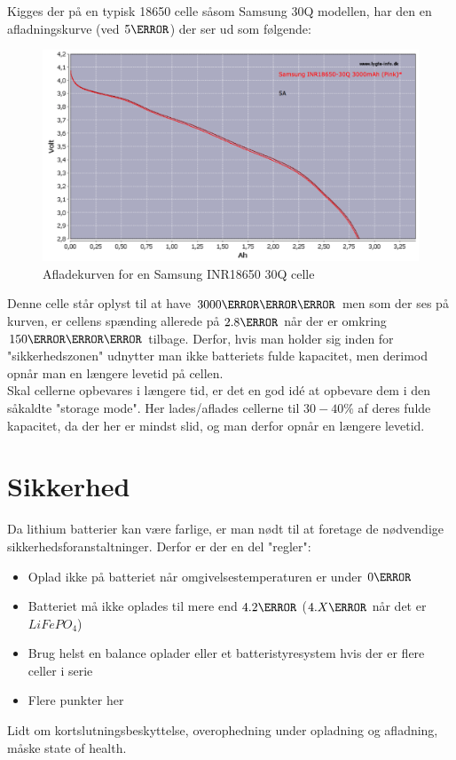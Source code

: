 Kigges der på en typisk 18650 celle såsom Samsung 30Q modellen, har den en afladningskurve (ved $5\ampere$) der ser ud som følgende: 

\begin{figure}[h]
\centering
\includegraphics[width=15cm]{billeder/samsung-inr18650-discharge.png}
\caption{Afladekurven for en Samsung INR18650 30Q celle\protect\footnotemark}
\label{fig:30q_discharge}
\end{figure}

Denne celle står oplyst til at have $3000\milli\ampere\hour$ men som der ses på kurven, er cellens spænding allerede på $2.8\volt$ når der er omkring $150\milli\ampere\hour$ tilbage. Derfor, hvis man holder sig inden for "sikkerhedszonen" \space udnytter man ikke batteriets fulde kapacitet, men derimod opnår man en længere levetid på cellen. \\

Skal cellerne opbevares i længere tid, er det en god idé at opbevare dem i den såkaldte "storage mode". Her lades/aflades cellerne til $30-40\percent$ af deres fulde kapacitet, da der her er mindst slid, og man derfor opnår en længere levetid. 

\section{Sikkerhed}
Da lithium batterier kan være farlige, er man nødt til at foretage de nødvendige sikkerhedsforanstaltninger. Derfor er der en del "regler":
\begin{itemize}
\item Oplad ikke på batteriet når omgivelsestemperaturen er under $0\degreeCelsius$
\item Batteriet må ikke oplades til mere end $4.2\volt$ ($4.X\volt$ når det er $LiFePO_4$)
\item Brug helst en balance oplader eller et batteristyresystem hvis der er flere celler i serie
\item Flere punkter her
\end{itemize}

Lidt om kortslutningsbeskyttelse, overophedning under opladning og afladning, måske state of health.
